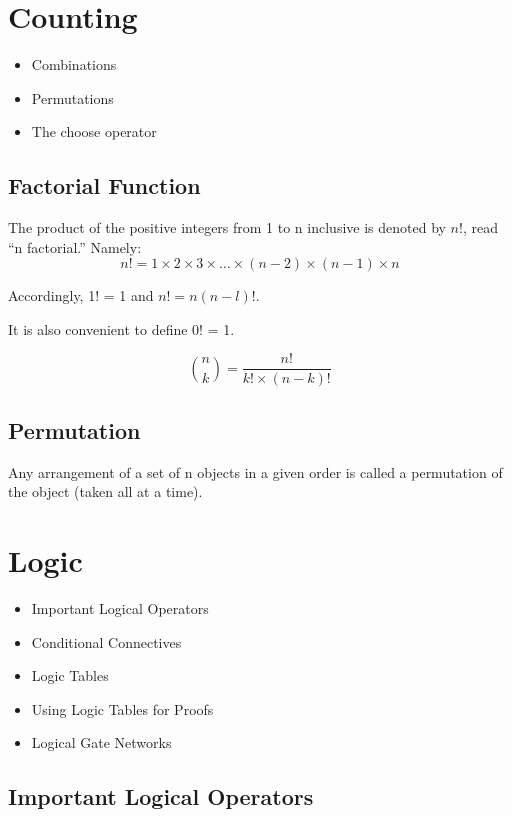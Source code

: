 \documentclass[12pt]{article}
\begin{document}
\section{Counting}
\begin{itemize}
\item Combinations
\item Permutations
\item The choose operator
\end{itemize}

\subsection*{Factorial Function}
The product of the positive integers from 1 to n inclusive is denoted by $n!$, read “n factorial.” Namely:
\[n! = 1 \times 2 \times 3 \times \ldots \times (n−2) \times(n−1)\times n\] 

Accordingly, 1! = 1 and $n! = n(n − l)!$. 

It is also convenient to define 0! = 1.


\[ {n \choose k} = \frac{n!}{k! \times (n-k)!} \]


\subsection*{Permutation}
Any arrangement of a set of n objects in a given order is called a permutation of the object (taken all at a time).

\newpage
\section{Logic}
\begin{itemize}
\item Important Logical Operators
\item Conditional Connectives
\item Logic Tables
\item Using Logic Tables for Proofs
\item Logical Gate Networks
\end{itemize}



\subsection*{Important Logical Operators}
\end{document}

